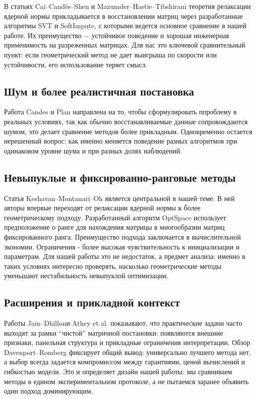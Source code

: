 \documentclass[a4paper,12pt]{article}
\begin{document}
В статьях Cai--Cand\`es--Shen и Mazumder--Hastie--Tibshirani теоретия релаксации ядерной нормы прикладывается в восстановлении матриц через разработанные алгоритмы SVT и SoftImpute, с которыми ведется основное сравнение в нашей работе. Их преимущество $-$ устойчивое поведение и хорошая инженерная применимость на разреженных матрицах. Для нас это ключевой сравнительный пункт: если геометрический метод не дает выигрыша по скорости или устойчивости, его использование теряет смысл.

\subsection{Шум и более реалистичная постановка}

Работа Candes и Plan направлена на то, чтобы сформулировать ппроблему в реальных условиях, так как обычно восстанавливаемые данные сопровождаются шумом, это делает сравнение методов более прикладным. Одновременно остается нерешенный вопрос: как именно меняется поведение разных алгоритмов при одинаковом уровне шума и при разных долях наблюдений.

\subsection{Невыпуклые и фиксированно-ранговые методы}

Статья Keshavan--Montanari--Oh является центральной в нашей теме. В ней авторы впервые переходят от релаксации ядерной нормы к более геометрическому подходу. Разработанный алгоритм OptSpace использует предположение о ранге для нахождения матрицы в многообразии матриц фиксированного ранга. Преимущество подхода заключается в вычислительной экономии. Ограничения - более высокая чувствительность к инициализации и параметрам. Для нашей работы это не недостаток, а предмет анализа: именно в таких условиях интересно проверять, насколько геометрические методы уменьшают нестабильность невыпуклой оптимизации.

\subsection{Расширения и прикладной контекст}

Работы Jain--Dhillonи Athey et al. показывают, что практические задачи часто выходят за рамки ``чистой'' матричной постановки: появляются внешние признаки, панельная структура и прикладные ограничения интерпретации. Обзор Davenport--Romberg фиксирует общий вывод: универсально лучшего метода нет, а выбор всегда задается компромиссом между гарантиями, ценой вычислений и гибкостью модели. Это и определяет дизайн нашей работы: мы сравниваем методы в едином экспериментальном протоколе, а не пытаемся заранее объявить один подход доминирующим.
\end{document}
